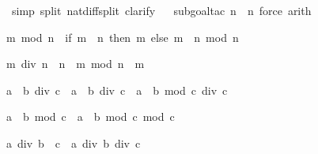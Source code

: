 \begin{isabellebody}
\isamarkupfalse%
\ {\isacharparenleft}simp\ split{\isacharcolon}\ nat{\isacharunderscore}diff{\isacharunderscore}split{\isacharcomma}\ clarify{\isacharparenright}\isanewline
\ %
\isanewline
\isamarkupfalse%
\ {\isacharparenleft}subgoal{\isacharunderscore}tac\ {\isachardoublequote}n{\isacharequal}{}\ {\isacharbar}\ n{\isacharequal}{}{\isachardoublequote}{\isacharcomma}\ force{\isacharcomma}\ arith{\isacharparenright}\isanewline
\isamarkupfalse%
\isamarkupfalse%
%
\begin{isamarkuptext}%
\begin{isabelle}%
m\ mod\ n\ {\isacharequal}\ {\isacharparenleft}if\ m\ {\isacharless}\ n\ then\ m\ else\ {\isacharparenleft}m\ {\isacharminus}\ n{\isacharparenright}\ mod\ n{\isacharparenright}%
\end{isabelle}

\begin{isabelle}%
m\ div\ n\ {\isacharasterisk}\ n\ {\isacharplus}\ m\ mod\ n\ {\isacharequal}\ m%
\end{isabelle}


\begin{isabelle}%
a\ {\isacharasterisk}\ b\ div\ c\ {\isacharequal}\ a\ {\isacharasterisk}\ {\isacharparenleft}b\ div\ c{\isacharparenright}\ {\isacharplus}\ a\ {\isacharasterisk}\ {\isacharparenleft}b\ mod\ c{\isacharparenright}\ div\ c%
\end{isabelle}

\begin{isabelle}%
a\ {\isacharasterisk}\ b\ mod\ c\ {\isacharequal}\ a\ {\isacharasterisk}\ {\isacharparenleft}b\ mod\ c{\isacharparenright}\ mod\ c%
\end{isabelle}

\begin{isabelle}%
a\ div\ {\isacharparenleft}b\ {\isacharasterisk}\ c{\isacharparenright}\ {\isacharequal}\ a\ div\ b\ div\ c%
\end{isabelle}


\end{isamarkuptext}
\end{isabellebody}
